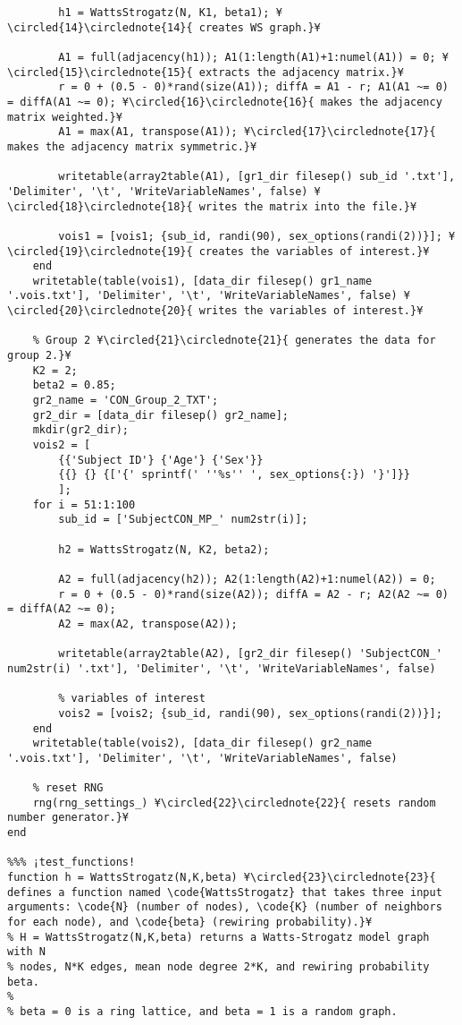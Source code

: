 \documentclass{tufte-handout}
\begin{document}
\begin{lstlisting}
        h1 = WattsStrogatz(N, K1, beta1); ¥\circled{14}\circlednote{14}{ creates WS graph.}¥  

        A1 = full(adjacency(h1)); A1(1:length(A1)+1:numel(A1)) = 0; ¥\circled{15}\circlednote{15}{ extracts the adjacency matrix.}¥ 
        r = 0 + (0.5 - 0)*rand(size(A1)); diffA = A1 - r; A1(A1 ~= 0) = diffA(A1 ~= 0); ¥\circled{16}\circlednote{16}{ makes the adjacency matrix weighted.}¥
        A1 = max(A1, transpose(A1)); ¥\circled{17}\circlednote{17}{ makes the adjacency matrix symmetric.}¥

        writetable(array2table(A1), [gr1_dir filesep() sub_id '.txt'], 'Delimiter', '\t', 'WriteVariableNames', false) ¥\circled{18}\circlednote{18}{ writes the matrix into the file.}¥

        vois1 = [vois1; {sub_id, randi(90), sex_options(randi(2))}]; ¥\circled{19}\circlednote{19}{ creates the variables of interest.}¥
    end
    writetable(table(vois1), [data_dir filesep() gr1_name '.vois.txt'], 'Delimiter', '\t', 'WriteVariableNames', false) ¥\circled{20}\circlednote{20}{ writes the variables of interest.}¥

    % Group 2 ¥\circled{21}\circlednote{21}{ generates the data for group 2.}¥  
    K2 = 2; 
    beta2 = 0.85;
    gr2_name = 'CON_Group_2_TXT';
    gr2_dir = [data_dir filesep() gr2_name];
    mkdir(gr2_dir);
    vois2 = [
        {{'Subject ID'} {'Age'} {'Sex'}}
        {{} {} {['{' sprintf(' ''%s'' ', sex_options{:}) '}']}}
        ];
    for i = 51:1:100
        sub_id = ['SubjectCON_MP_' num2str(i)];

        h2 = WattsStrogatz(N, K2, beta2);

        A2 = full(adjacency(h2)); A2(1:length(A2)+1:numel(A2)) = 0;
        r = 0 + (0.5 - 0)*rand(size(A2)); diffA = A2 - r; A2(A2 ~= 0) = diffA(A2 ~= 0);
        A2 = max(A2, transpose(A2));

        writetable(array2table(A2), [gr2_dir filesep() 'SubjectCON_' num2str(i) '.txt'], 'Delimiter', '\t', 'WriteVariableNames', false)

        % variables of interest
        vois2 = [vois2; {sub_id, randi(90), sex_options(randi(2))}];
    end
    writetable(table(vois2), [data_dir filesep() gr2_name '.vois.txt'], 'Delimiter', '\t', 'WriteVariableNames', false)

    % reset RNG
    rng(rng_settings_) ¥\circled{22}\circlednote{22}{ resets random number generator.}¥  
end

%%% ¡test_functions! 
function h = WattsStrogatz(N,K,beta) ¥\circled{23}\circlednote{23}{ defines a function named \code{WattsStrogatz} that takes three input arguments: \code{N} (number of nodes), \code{K} (number of neighbors for each node), and \code{beta} (rewiring probability).}¥
% H = WattsStrogatz(N,K,beta) returns a Watts-Strogatz model graph with N
% nodes, N*K edges, mean node degree 2*K, and rewiring probability beta.
%
% beta = 0 is a ring lattice, and beta = 1 is a random graph.


\end{lstlisting}
\end{document}
